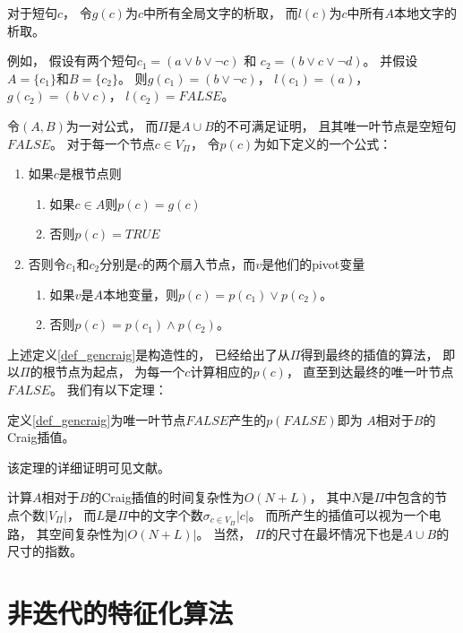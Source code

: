 对于短句$c$，
令$g(c)$为$c$中所有全局文字的析取，
而$l(c)$为$c$中所有$A$本地文字的析取。

例如，
假设有两个短句$c_1=(a\vee b\vee\neg c)$ 和
$c_2=(b\vee c\vee\neg d)$。
并假设$A=\{c_1\}$和$B=\{c_2\}$。
则$g(c_1)=(b\vee\neg c)$，
$l(c_1)=(a)$，
$g(c_2)=(b\vee c)$，
$l(c_2)=FALSE$。


\begin{definition}\label{def_gencraig}
令$(A,B)$为一对公式，
而$\Pi$是$A\cup B$的不可满足证明，
且其唯一叶节点是空短句$FALSE$。
对于每一个节点$c\in V_{\Pi}$，
令$p(c)$为如下定义的一个公式：
\begin{enumerate}
\item 如果$c$是根节点则
  \begin{enumerate}
    \item 如果$c\in A$则$p(c)=g(c)$
    \item 否则$p(c)=TRUE$
  \end{enumerate}
\item 否则令$c_1$和$c_2$分别是$c$的两个扇入节点，而$v$是他们的pivot变量
  \begin{enumerate}
    \item 如果$v$是$A$本地变量，则$p(c)=p(c_1)\vee p(c_2)$。
    \item 否则$p(c)=p(c_1)\wedge p(c_2)$。
  \end{enumerate}
\end{enumerate}
\end{definition}

上述定义\ref{def_gencraig}是构造性的，
已经给出了从$\Pi$得到最终的插值的算法，
即以$\Pi$的根节点为起点，
为每一个$c$计算相应的$p(c)$，
直至到达最终的唯一叶节点$FALSE$。
我们有以下定理：

\begin{theorem}
定义\ref{def_gencraig}为唯一叶节点$FALSE$产生的$p(FALSE)$即为
$A$相对于$B$的Craig插值。
\end{theorem}

该定理的详细证明可见文献。

计算$A$相对于$B$的Craig插值的时间复杂性为$O(N+L)$，
其中$N$是$\Pi$中包含的节点个数$|V_{\Pi}|$，
而$L$是$\Pi$中的文字个数$\sigma_{c\in V_{\Pi}}|c|$。
而所产生的插值可以视为一个电路，
其空间复杂性为$|O(N+L)|$。
当然，
$\Pi$的尺寸在最坏情况下也是$A\cup B$的尺寸的指数。



\section{非迭代的特征化算法}\label{sec_craigchar}

